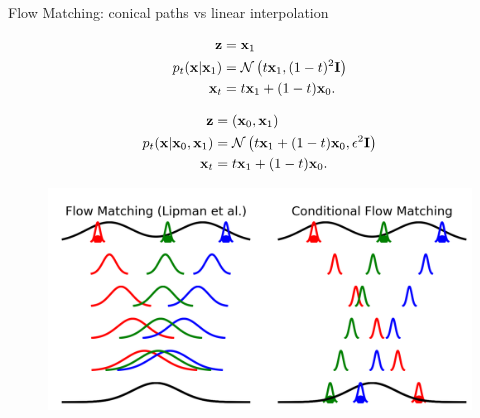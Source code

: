 \begin{frame}{Flow Matching: conical paths vs linear interpolation}
	\begin{minipage}[t]{0.5\columnwidth}
		\begin{align*}
			\mathbf{z} & = \mathbf{x}_1 \\
			p_t(\mathbf{x} | \mathbf{x}_1) &= \mathcal{N}\left(t \mathbf{x}_1, (1-t)^2 \mathbf{I}\right) \\
			\mathbf{x}_t &= t \mathbf{x}_1 + (1 - t) \mathbf{x}_0. 
		\end{align*}
	\end{minipage}%
	\begin{minipage}[t]{0.5\columnwidth}
		\begin{align*}
			\mathbf{z} & = (\mathbf{x}_0, \mathbf{x}_1) \\
			p_t(\mathbf{x} | \mathbf{x}_0, \mathbf{x}_1) &= \mathcal{N}\left(t \mathbf{x}_1 + (1 - t) \mathbf{x}_0, \epsilon^2 \mathbf{I}\right) \\
			\mathbf{x}_t &= t \mathbf{x}_1 + (1 - t) \mathbf{x}_0. 
		\end{align*}
	\end{minipage}
	\begin{figure}
		\centering
		\includegraphics[width=0.8\linewidth]{figs/compare_conditionings}
	\end{figure}
\end{frame}
